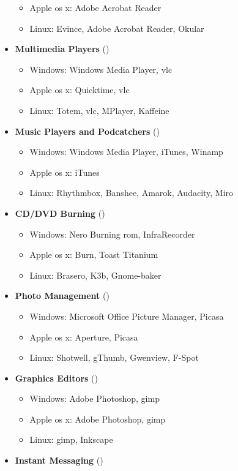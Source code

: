 \begin{latin}
\begin{itemize}
\begin{itemize}
			\item Apple os x: Adobe Acrobat Reader
			\item Linux: Evince, Adobe Acrobat Reader, Okular
		\end{itemize}
		\item \textbf{Multimedia Players} ()
		\begin{itemize}
			\item Windows: Windows Media Player, vlc
			\item Apple os x: Quicktime, vlc
			\item Linux: Totem, vlc, MPlayer, Kaffeine
		\end{itemize}
		\item \textbf{Music Players and Podcatchers} ()
		\begin{itemize}
			\item Windows: Windows Media Player, iTunes, Winamp
			\item Apple os x: iTunes
			\item Linux: Rhythmbox, Banshee, Amarok, Audacity, Miro
		\end{itemize}
		\item \textbf{CD/DVD Burning} ()
		\begin{itemize}
			\item Windows: Nero Burning rom, InfraRecorder
			\item Apple os x: Burn, Toast Titanium
			\item Linux: Brasero, K3b, Gnome-baker
		\end{itemize}
		\item \textbf{Photo Management} ()
		\begin{itemize}
			\item Windows: Microsoft Office Picture Manager, Picasa
			\item Apple os x: Aperture, Picasa
			\item Linux: Shotwell, gThumb, Gwenview, F-Spot
		\end{itemize}
		\item \textbf{Graphics Editors} ()
		\begin{itemize}
			\item Windows: Adobe Photoshop, gimp
			\item Apple os x: Adobe Photoshop, gimp
			\item Linux: gimp, Inkscape
		\end{itemize}
		\item \textbf{Instant Messaging} ()

\end{itemize}
\end{latin}
